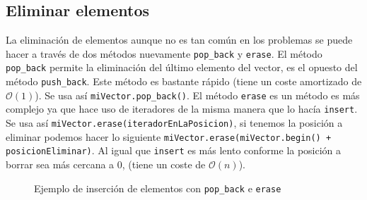 \documentclass{article}
\begin{document}
    \subsection{Eliminar elementos}

    La eliminación de elementos aunque no es tan común en los problemas se puede hacer a través de dos métodos nuevamente
    \texttt{pop\_back} y \texttt{erase}. El método \texttt{pop\_back} permite la eliminación del último elemento del
    vector, es el opuesto del método \texttt{push\_back}. Este método es bastante rápido (tiene un coste amortizado de 
    $\mathcal{O}(1)$). Se usa así \texttt{miVector.pop\_back()}. El método \texttt{erase} es un método es más complejo 
    ya que hace uso de iteradores de la misma manera que lo hacía \texttt{insert}. Se usa así \texttt{miVector.erase(iteradorEnLaPosicion)},
    si tenemos la posición a eliminar podemos hacer lo siguiente \texttt{miVector.erase(miVector.begin() + posicionEliminar)}.
    Al igual que \texttt{insert} es más lento conforme la posición a borrar sea más cercana a 0, (tiene un coste de 
    $\mathcal{O}(n)$).

    \begin{figure}[h]
        \centering
        \caption{Ejemplo de inserción de elementos con \texttt{pop\_back} e \texttt{erase}}
    \end{figure}
\end{document}
